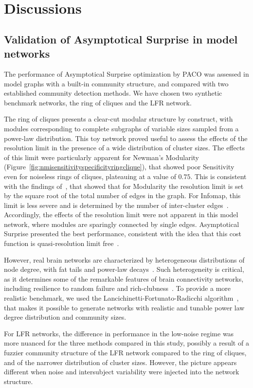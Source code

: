 \section{Discussions}
\subsection{Validation of Asymptotical Surprise in model networks}
The performance of Asymptotical Surprise optimization by PACO was assessed in model graphs with a built-in community structure, and compared with two established community detection methods. We have chosen two synthetic benchmark networks, the ring of cliques and the LFR network.

The ring of cliques presents a clear-cut modular structure by construct, with modules corresponding to complete subgraphs of variable sizes sampled from a power-law distribution. 
This toy network proved useful to assess the effects of the resolution limit in the presence of a wide distribution of cluster sizes. The effects of this limit were particularly apparent for Newman's Modularity (Figure~\ref{fig:nmisensitivityspecificityringclique}), that showed poor Sensitivity even for noiseless rings of cliques, plateauing at a value of $0.75$.
This is consistent with the findings of~\cite{fortunato2007}, that showed that for Modularity the resolution limit is set by the square root of the total number of edges in the graph.
For Infomap, this limit is less severe and is determined by the number of inter-cluster edges~\cite{kawamoto2015}. Accordingly, the effects of the resolution limit were not apparent in this model network, where modules are sparingly connected by single edges.
Asymptotical Surprise presented the best performance, consistent with the idea that this cost function is quasi-resolution limit free~\cite{traag2015}.

However, real brain networks are characterized by heterogeneous distributions of node degree, with fat tails and power-law decays~\cite{bullmore2009}. Such heterogeneity is critical, as it determines some of the remarkable features of brain connectivity networks, including resilience to random failure and rich-clubness~\cite{vandenheuvel2011,vandenheuvel2013a}. To provide a more realistic benchmark, we used the Lancichinetti-Fortunato-Radicchi algorithm~\cite{lancichinetti2008}, that makes it possible to generate networks with realistic and tunable power law degree distribution and community sizes.

For LFR networks, the difference in performance in the low-noise regime was more nuanced for the three methods compared in this study, possibly a result of a fuzzier community structure of the LFR network compared to the ring of cliques, and of the narrower distribution of cluster sizes. However, the picture appears different when noise and intersubject variability were injected into the network structure.

